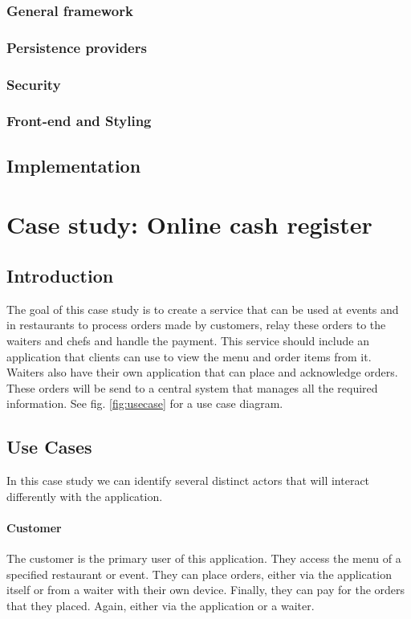 \documentclass[12pt]{article}
\begin{document}
\subsubsection{General framework}
\subsubsection{Persistence providers}
\subsubsection{Security}
\subsubsection{Front-end and Styling}
\subsection{Implementation}
\section{Case study: Online cash register}
\subsection{Introduction}
The goal of this case study is to create a service that can be used at events and in restaurants to process orders made by customers, relay these orders to the waiters and chefs and handle the payment. This service should include an application that clients can use to view the menu and order items from it. Waiters also have their own application that can place and acknowledge orders. These orders will be send to a central system that manages all the required information. See fig. \ref{fig:usecase} for a use case diagram.
\subsection{Use Cases}
In this case study we can identify several distinct actors that will interact differently with the application.
\paragraph{Customer}
The customer is the primary user of this application. They access the menu of a specified restaurant or event. They can place orders, either via the application itself or from a waiter with their own device. Finally, they can pay for the orders that they placed. Again, either via the application or a waiter.
\end{document}
